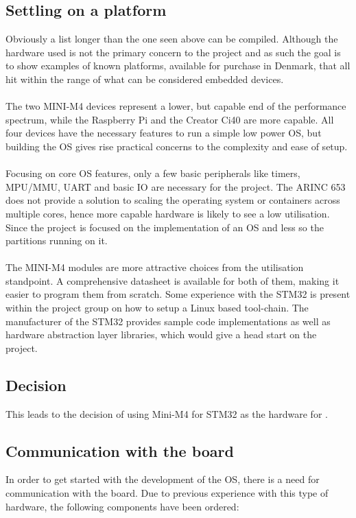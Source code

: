 \subsection{Settling on a platform}\label{section:settleing_platform}
Obviously a list longer than the one seen above can be compiled.
Although the hardware used is not the primary concern to the project
and as such the goal is to show examples of known platforms,
available for purchase in Denmark,
that all hit within the range of what can be considered embedded devices.
\\\\
The two MINI-M4 devices represent a lower, but capable end of the performance spectrum,
while the Raspberry Pi and the Creator Ci40 are more capable.
All four devices have the necessary features to run a simple low power OS,
but building the OS gives rise practical concerns to the complexity and ease of setup.
\\\\
Focusing on core OS features, only a few basic peripherals
like timers, MPU/MMU, UART and basic IO are necessary for the project.
The ARINC 653 does not provide a solution to scaling the operating system
or containers across multiple cores,
hence more capable hardware is likely to see a low utilisation.
Since the project is focused on the implementation of an OS
and less so the partitions running on it.
\\\\
The MINI-M4 modules are more attractive choices from the utilisation standpoint.
A comprehensive datasheet is available for both of them,
making it easier to program them from scratch.
Some experience with the STM32 is present within the project group
on how to setup a Linux based tool-chain. The manufacturer of the STM32
provides sample code implementations as well as hardware abstraction
layer libraries, which would give a head start on the project.

\subsection{Decision}
This leads to the decision of using Mini-M4 for STM32 as the hardware
for \OSname{}.

\subsection{Communication with the board}
In order to get started with the development of the OS, there is a need for
communication with the board. Due to previous experience with
this type of hardware, the following components have been ordered:


